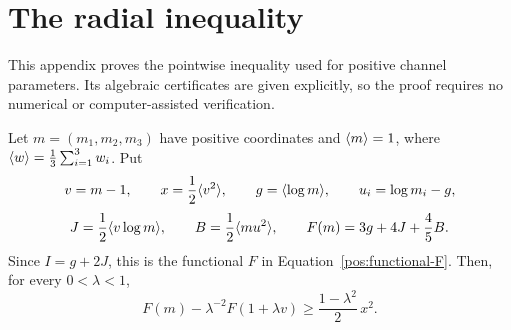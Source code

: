 \section{The radial inequality}\label{rad:section}

This appendix proves the pointwise inequality used for positive channel
parameters.  Its algebraic certificates are given explicitly, so the proof
requires no numerical or computer-assisted verification.

\begin{lemma}\label{rad:lemma}
Let $m=(m_1,m_2,m_3)$ have positive coordinates and $\langle m\rangle=1$, where
$\langle w\rangle=\frac13\sum_{i=1}^3w_i$.  Put
\[
 v=m-1,\qquad x=\frac12\langle v^2\rangle,\qquad
 g=\langle \log m\rangle,\qquad u_i=\log m_i-g,
\]
\[
 J=\frac12\langle v\log m\rangle,\qquad B=\frac12\langle m u^2\rangle,
 \qquad F(m)=3g+4J+\frac45B.
\]
Since $I=g+2J$, this is the functional $F$ in
Equation~\eqref{pos:functional-F}. Then, for every $0<\lambda<1$,
\begin{equation}\label{rad:inequality}
 F(m)-\lambda^{-2}F(1+\lambda v)
 \geq \frac{1-\lambda^2}{2}\,x^2.
\end{equation}
\end{lemma}

